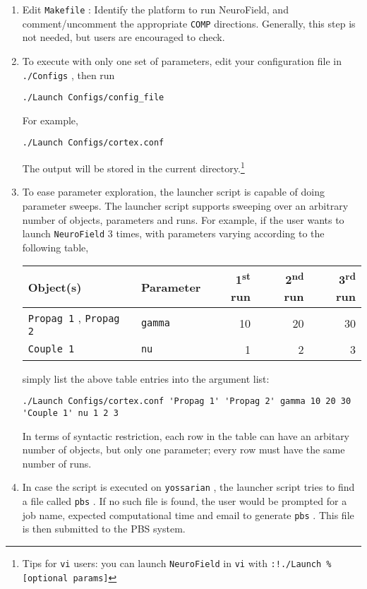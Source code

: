 \documentclass[12pt,a4paper]{article}
\newcommand{\type}[1]{ {\small\small\tt #1} }
\begin{document}
\begin{enumerate}

\item Edit \type{Makefile}: Identify the platform to run NeuroField, and comment/uncomment the appropriate \type{COMP} directions. Generally, this step is not needed, but users are encouraged to check.

\item To execute with only one set of parameters, edit your configuration file in \type{./Configs}, then run
\begin{lstlisting}
./Launch Configs/config_file
\end{lstlisting}
For example,
\begin{lstlisting}
./Launch Configs/cortex.conf
\end{lstlisting}
The output will be stored in the current directory.\footnote{Tips for \type{vi} users: you can launch \type{NeuroField} in \type{vi} with \type{:!./Launch \% [optional params]} }

\item To ease parameter exploration, the launcher script is capable of doing parameter sweeps. The launcher script supports sweeping over an arbitrary number of objects, parameters and runs. For example, if the user wants to launch \type{NeuroField} 3 times, with parameters varying according to the following table,

\begin{tabular}{l l r r r}
Object(s)&Parameter&1\textsuperscript{st} run&2\textsuperscript{nd} run&3\textsuperscript{rd} run\\
\hline
\type{Propag 1}, \type{Propag 2}&\type{gamma}&10&20&30\\
\type{Couple 1}&\type{nu}&1&2&3
\end{tabular}

simply list the above table entries into the argument list:
\begin{lstlisting}
./Launch Configs/cortex.conf 'Propag 1' 'Propag 2' gamma 10 20 30 'Couple 1' nu 1 2 3
\end{lstlisting}

In terms of syntactic restriction, each row in the table can have an arbitary number of objects, but only one parameter; every row must have the same number of runs.

\item In case the script is executed on \type{yossarian}, the launcher script tries to find a file called \type{pbs}. If no such file is found, the user would be prompted for a job name, expected computational time and email to generate \type{pbs}. This file is then submitted to the PBS system.


\end{enumerate}
\end{document}
